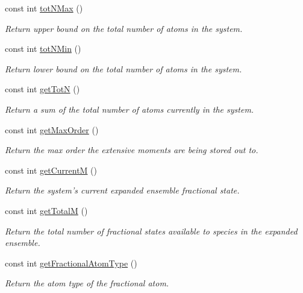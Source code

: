 \begin{DoxyCompactItemize}
const int \hyperlink{classsim_system_aee2c65ecb43a35c0c4d070cdb45f7dc0}{tot\-N\-Max} ()
\begin{DoxyCompactList}\small\item\em Return upper bound on the total number of atoms in the system. \end{DoxyCompactList}\item 
const int \hyperlink{classsim_system_af10842e0eaa638373b8717c87b47e6bc}{tot\-N\-Min} ()
\begin{DoxyCompactList}\small\item\em Return lower bound on the total number of atoms in the system. \end{DoxyCompactList}\item 
const int \hyperlink{classsim_system_a37dd827f4057049763351510147b9f1d}{get\-Tot\-N} ()
\begin{DoxyCompactList}\small\item\em Return a sum of the total number of atoms currently in the system. \end{DoxyCompactList}\item 
const int \hyperlink{classsim_system_afe08187d318113c33bda890c69570c36}{get\-Max\-Order} ()
\begin{DoxyCompactList}\small\item\em Return the max order the extensive moments are being stored out to. \end{DoxyCompactList}\item 
const int \hyperlink{classsim_system_a299fe4372e610b554eaaf5f5957b2dbc}{get\-Current\-M} ()
\begin{DoxyCompactList}\small\item\em Return the system's current expanded ensemble fractional state. \end{DoxyCompactList}\item 
const int \hyperlink{classsim_system_aa4ad1afff101bb530e1590df05035276}{get\-Total\-M} ()
\begin{DoxyCompactList}\small\item\em Return the total number of fractional states available to species in the expanded ensemble. \end{DoxyCompactList}\item 
const int \hyperlink{classsim_system_a0500a9e84eecfbde7a98cf8a34f719d5}{get\-Fractional\-Atom\-Type} ()
\begin{DoxyCompactList}\small\item\em Return the atom type of the fractional atom. \end{DoxyCompactList}\item 

\end{DoxyCompactItemize}
